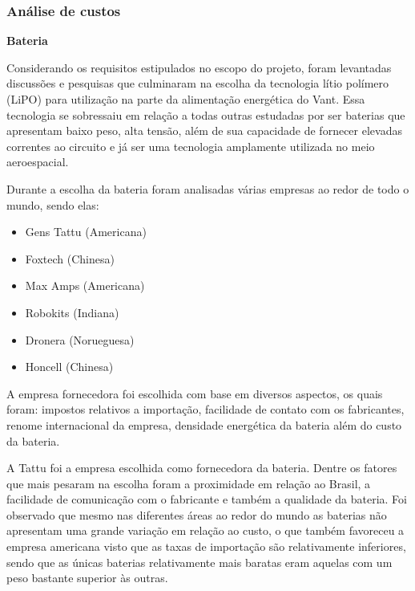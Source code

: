 \subsubsection{Análise de custos}

\textbf{Bateria}

Considerando os requisitos estipulados no escopo do projeto, foram levantadas discussões e pesquisas que culminaram na escolha da tecnologia lítio polímero (LiPO) para utilização na parte da alimentação energética do Vant. Essa tecnologia se sobressaiu em relação a todas outras estudadas por ser baterias que apresentam baixo peso, alta tensão, além de sua capacidade de fornecer elevadas correntes ao circuito e já ser uma tecnologia amplamente utilizada no meio aeroespacial.

Durante a escolha da bateria foram analisadas várias empresas ao redor de todo o mundo, sendo elas:

\begin{itemize}
 
\item Gens Tattu (Americana)

\item Foxtech (Chinesa)

\item Max Amps (Americana)

\item Robokits (Indiana)

\item Dronera (Norueguesa)

\item Honcell (Chinesa)

\end{itemize}

A empresa fornecedora foi escolhida com base em diversos aspectos, os quais foram: impostos relativos a importação, facilidade de contato com os fabricantes, renome internacional da empresa, densidade energética da bateria além do custo da bateria.

A  Tattu foi a empresa escolhida como fornecedora da bateria.  Dentre os fatores que mais pesaram na escolha foram a proximidade em relação ao Brasil, a facilidade de comunicação com o fabricante e também a qualidade da bateria. Foi observado que mesmo nas diferentes áreas ao redor do mundo as baterias não apresentam uma grande variação em relação ao custo, o que também favoreceu a empresa americana visto que as taxas de importação são relativamente inferiores, sendo que as únicas baterias relativamente mais baratas eram aquelas com um peso bastante superior às outras.


